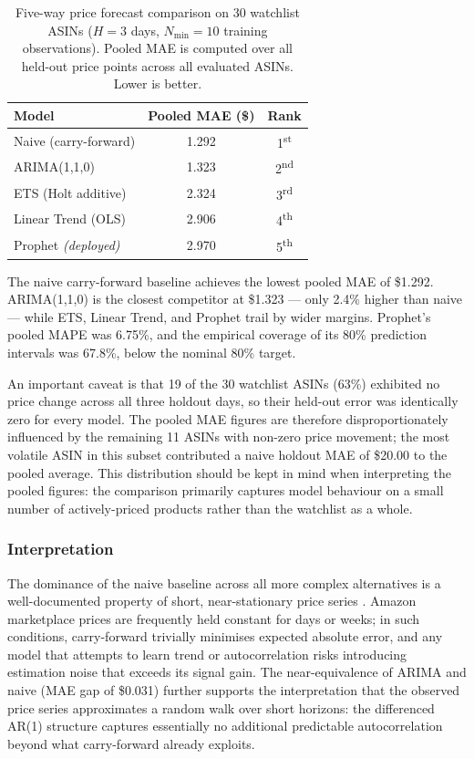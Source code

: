 \begin{table}[H]
  \centering
  \begin{tabular}{lcc}
    \toprule
    \textbf{Model} & \textbf{Pooled MAE (\$)} & \textbf{Rank} \\
    \midrule
    Naive (carry-forward)    & 1.292 & 1\textsuperscript{st} \\
    ARIMA(1,1,0)             & 1.323 & 2\textsuperscript{nd} \\
    ETS (Holt additive)      & 2.324 & 3\textsuperscript{rd} \\
    Linear Trend (OLS)       & 2.906 & 4\textsuperscript{th} \\
    Prophet \emph{(deployed)} & 2.970 & 5\textsuperscript{th} \\
    \bottomrule
  \end{tabular}
  \caption{Five-way price forecast comparison on 30 watchlist ASINs ($H = 3$ days, $N_{\min} = 10$ training observations). Pooled MAE is computed over all held-out price points across all evaluated ASINs. Lower is better.}
  \label{tab:forecast_comparison}
\end{table}

The naive carry-forward baseline achieves the lowest pooled MAE of \$1.292. ARIMA(1,1,0) is the closest competitor at \$1.323 --- only 2.4\% higher than naive --- while ETS, Linear Trend, and Prophet trail by wider margins. Prophet's pooled MAPE was 6.75\%, and the empirical coverage of its 80\% prediction intervals was 67.8\%, below the nominal 80\% target.

An important caveat is that 19 of the 30 watchlist ASINs (63\%) exhibited no price change across all three holdout days, so their held-out error was identically zero for every model. The pooled MAE figures are therefore disproportionately influenced by the remaining 11 ASINs with non-zero price movement; the most volatile ASIN in this subset contributed a naive holdout MAE of \$20.00 to the pooled average. This distribution should be kept in mind when interpreting the pooled figures: the comparison primarily captures model behaviour on a small number of actively-priced products rather than the watchlist as a whole.

\subsubsection*{Interpretation}

The dominance of the naive baseline across all more complex alternatives is a well-documented property of short, near-stationary price series \citep{makridakis2018m4}. Amazon marketplace prices are frequently held constant for days or weeks; in such conditions, carry-forward trivially minimises expected absolute error, and any model that attempts to learn trend or autocorrelation risks introducing estimation noise that exceeds its signal gain. The near-equivalence of ARIMA and naive (MAE gap of \$0.031) further supports the interpretation that the observed price series approximates a random walk over short horizons: the differenced AR(1) structure captures essentially no additional predictable autocorrelation beyond what carry-forward already exploits.

